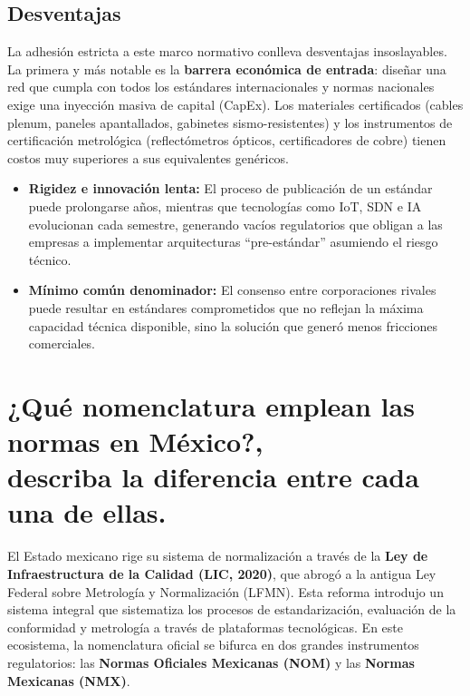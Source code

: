 \documentclass[a4paper,12pt]{article}
\begin{document}
\subsection*{Desventajas}

La adhesión estricta a este marco normativo conlleva desventajas insoslayables. La primera y más notable es la \textbf{barrera económica de entrada}: diseñar una red que cumpla con todos los estándares internacionales y normas nacionales exige una inyección masiva de capital (CapEx). Los materiales certificados (cables plenum, paneles apantallados, gabinetes sismo-resistentes) y los instrumentos de certificación metrológica (reflectómetros ópticos, certificadores de cobre) tienen costos muy superiores a sus equivalentes genéricos.

\begin{itemize}
    \item \textbf{Rigidez e innovación lenta:} El proceso de publicación de un estándar puede prolongarse años, mientras que tecnologías como IoT, SDN e IA evolucionan cada semestre, generando vacíos regulatorios que obligan a las empresas a implementar arquitecturas ``pre-estándar'' asumiendo el riesgo técnico.
    \item \textbf{Mínimo común denominador:} El consenso entre corporaciones rivales puede resultar en estándares comprometidos que no reflejan la máxima capacidad técnica disponible, sino la solución que generó menos fricciones comerciales.
\end{itemize}

\newpage

\section[¿Qué nomenclatura emplean las normas en México?, describa la diferencia entre cada una de ellas.]{¿Qué nomenclatura emplean las normas en México?,\texorpdfstring{\\}{} describa la diferencia entre cada una de ellas.}

El Estado mexicano rige su sistema de normalización a través de la \textbf{Ley de Infraestructura de la Calidad (LIC, 2020)}, que abrogó a la antigua Ley Federal sobre Metrología y Normalización (LFMN). Esta reforma introdujo un sistema integral que sistematiza los procesos de estandarización, evaluación de la conformidad y metrología a través de plataformas tecnológicas. En este ecosistema, la nomenclatura oficial se bifurca en dos grandes instrumentos regulatorios: las \textbf{Normas Oficiales Mexicanas (NOM)} y las \textbf{Normas Mexicanas (NMX)}.
\end{document}
